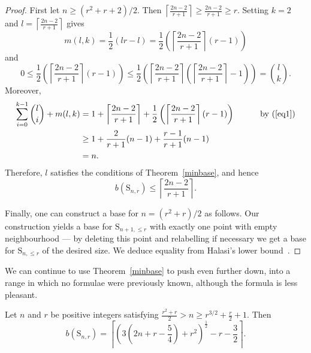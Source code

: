 \documentclass[ALCO,published]{cedram}
\renewcommand\S{\mathrm{S}}
\begin{document}
\begin{proof}
First let $n\geq (r^2+r+2)/2$. Then $\left\lceil\frac{2n-2}{r+1}\right\rceil\geq\frac{2n-2}{r+1}\geq r$. Setting $k=2$ and $l=\left\lceil\frac{2n-2}{r+1}\right\rceil$ gives \begin{equation}\label{eq1}m(l,k)=\frac{1}{2}\left(lr-l\right)=\frac{1}{2}\left(\left\lceil\frac{2n-2}{r+1}\right\rceil (r-1)\right)\end{equation} and $$0\leq \frac{1}{2}\left(\left\lceil\frac{2n-2}{r+1}\right\rceil (r-1)\right)\leq \frac{1}{2}\left(\left\lceil\frac{2n-2}{r+1}\right\rceil \left(\left\lceil\frac{2n-2}{r+1}\right\rceil-1\right)\right)=\binom{l}{k}.$$ Moreover, \begin{equation}\nonumber\begin{split}\sum_{i=0}^{k-1}\binom{l}{i}+m(l,k)&=1+\left\lceil\frac{2n-2}{r+1}\right\rceil+\frac{1}{2}\left(\left\lceil\frac{2n-2}{r+1}\right\rceil (r-1)\right)\quad\quad\quad\text{by (\ref{eq1})}\\&\geq 1+\frac{2}{r+1}(n-1)+\frac{r-1}{r+1}(n-1)\\&=n.\end{split}\end{equation} Therefore, $l$ satisfies the conditions of Theorem~\ref{minbase}, and hence $$b(\S_{n,r})\leq \left\lceil\frac{2n-2}{r+1}\right\rceil.$$ 

Finally, one can construct a base for $n=(r^2+r)/2$ as follows. Our construction yields a base for $\S_{n+1,\leq r}$ with exactly one point with empty neighbourhood --- by deleting this point and relabelling if necessary we get a base for  $\S_{n,\leq r}$ of the desired size. We deduce equality from Halasi's lower bound~\cite[Theorem 3.2]{hal}.
\end{proof}

We can continue to use Theorem~\ref{minbase} to push even further down, into a range in which no formulae were previously known, although the formula is less pleasant.

\begin{coro}\label{cor2}
Let $n$ and $r$ be positive integers satisfying $\frac{r^2+r}{2}>n\geq r^{3/2}+\frac{r}{2}+1$. Then $$b(\S_{n,r})=\left\lceil\left(3\left(2n+r-\frac{5}{4}\right)+r^2\right)^\frac{1}{2}-r-\frac{3}{2}\right\rceil.$$
\end{coro}
\end{document}
